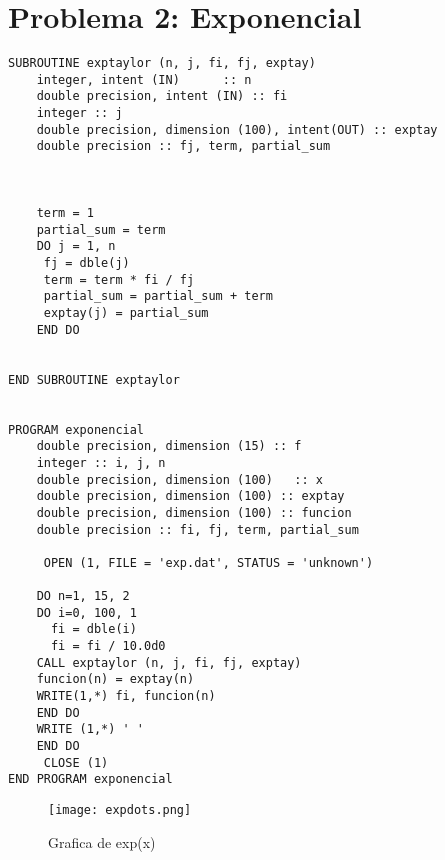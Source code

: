 \documentclass{article}
\begin{document}
\section{Problema 2: Exponencial}
\begin{verbatim}
SUBROUTINE exptaylor (n, j, fi, fj, exptay)
	integer, intent (IN)      :: n
	double precision, intent (IN) :: fi
	integer :: j
	double precision, dimension (100), intent(OUT) :: exptay
	double precision :: fj, term, partial_sum
	
	
	
	term = 1
	partial_sum = term
	DO j = 1, n
	 fj = dble(j)
	 term = term * fi / fj
	 partial_sum = partial_sum + term
	 exptay(j) = partial_sum
	END DO

	 
END SUBROUTINE exptaylor
	 

PROGRAM exponencial
	double precision, dimension (15) :: f
	integer :: i, j, n
	double precision, dimension (100)   :: x
	double precision, dimension (100) :: exptay
	double precision, dimension (100) :: funcion
	double precision :: fi, fj, term, partial_sum

     OPEN (1, FILE = 'exp.dat', STATUS = 'unknown')
	
	DO n=1, 15, 2
	DO i=0, 100, 1
	  fi = dble(i)
	  fi = fi / 10.0d0
	CALL exptaylor (n, j, fi, fj, exptay)
	funcion(n) = exptay(n)
	WRITE(1,*) fi, funcion(n)
	END DO
	WRITE (1,*) ' '
	END DO
     CLOSE (1)
END PROGRAM exponencial

\end{verbatim}

\begin{figure}
  \texttt{[image: expdots.png]}
  \caption{Grafica de exp(x)}
\end{figure}


\clearpage
\end{document}
